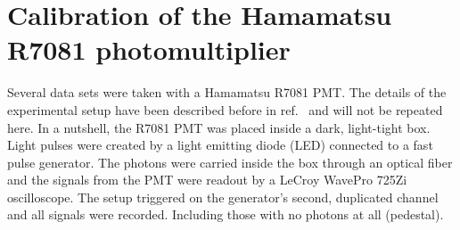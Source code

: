 \documentclass[a4paper,11pt]{article}
\begin{document}
\section{Calibration of the Hamamatsu R7081 photomultiplier}
\label{sec:res}
%

Several data sets were taken with a Hamamatsu R7081 PMT. 
The details of the experimental setup have been described before in ref.~\cite{me2} and will not be repeated here. 
In a nutshell, the R7081 PMT was placed inside a dark, light-tight box. Light pulses were created by a light emitting diode (LED) connected to a fast pulse generator. 
The photons were carried inside the box through an optical fiber and the signals from the PMT were readout by a LeCroy WavePro 725Zi oscilloscope.   
The setup triggered on the generator's second, duplicated channel and all signals were recorded. Including those with no photons at all (pedestal). 
\end{document}

